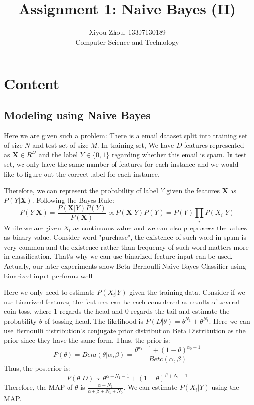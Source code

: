 \documentclass[11pt, oneside]{article}
\renewcommand{\vec}[1]{\mathbf{#1}}
\begin{document}
\title{Assignment 1: Naive Bayes (II)}
\author{Xiyou Zhou, 13307130189 \\ Computer Science and Technology}
\maketitle
\section{Content}
\subsection{Modeling using Naive Bayes}
Here we are given such a problem: There is a email dataset split into training set of size $N$ and test set of size $M$. In training set, We have $D$ features represented as $\vec{X} \in R^D$ and the label $Y \in \{0, 1\}$ regarding whether this email is spam. In test set, we only have the same number of features for each instance and we would like to figure out the correct label for each instance.

Therefore, we can represent the probability of label $Y$ given the features $\vec{X}$ as $P(Y|\vec{X})$. Following the Bayes Rule:
$$
	P(Y|\vec{X}) = \frac{P(\vec{X}|Y)P(Y)}{P(\vec{X})} \propto P(\vec{X}|Y)P(Y) = P(Y)\prod_i P(X_i|Y)
$$
While we are given $X_i$ as continuous value and we can also preprocess the values as binary value. Consider word "purchase", the existence of such word in spam is very common and the existence rather than frequency of such word matters more in classification. That's why we can use binarized feature input can be used. Actually, our later experiments show Beta-Bernoulli Naive Bayes Classifier using binarized input performs well.

Here we only need to estimate $P(X_i|Y)$ given the training data. Consider if we use binarized features, the features can be each considered as results of several coin toss, where 1 regards the head and 0 regards the tail and estimate the probability $\theta$ of tossing head. The likelihood is $P(D|\theta) = \theta^{N_1} + \theta^{N_0}$. Here we can use Bernoulli distribution's conjugate prior distribution Beta Distribution as the prior since they have the same form. Thus, the prior is:
$$P(\theta) = Beta(\theta | \alpha, \beta) = \frac{\theta^{\alpha_1-1}+(1-\theta)^{\alpha_0-1}}{Beta(\alpha, \beta)}$$
Thus, the posterior is:
$$P(\theta|D) \propto \theta^{\alpha+N_1-1}+(1-\theta)^{\beta+N_0-1}$$
Therefore, the MAP of $\theta$ is $\frac{\alpha+N_1}{\alpha+\beta+N_1+N_0}$. We can estimate $P(X_i|Y)$ using the MAP.
\end{document}
